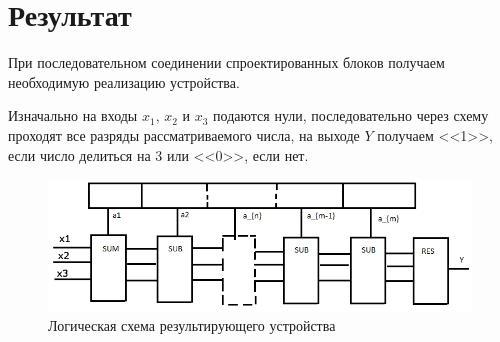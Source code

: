 \documentclass[utf8x, 12pt]{G7-32}
\begin{document}
\newpage


\section{Результат}


При последовательном соединении спроектированных блоков получаем необходимую реализацию устройства. 

Изначально на входы $x_1$, $x_2$ и $x_3$ подаются нули, последовательно через схему проходят все разряды рассматриваемого числа, на выходе $Y$ получаем <<1>>, если число делиться на 3 или <<0>>, если нет.


\begin{figure}[hhh!]
\begin{center}
\includegraphics[width=15cm]{img/shema2}
\end{center}
\vspace{-5mm}\caption{Логическая схема результирующего устройства}
\end{figure}
\end{document}
